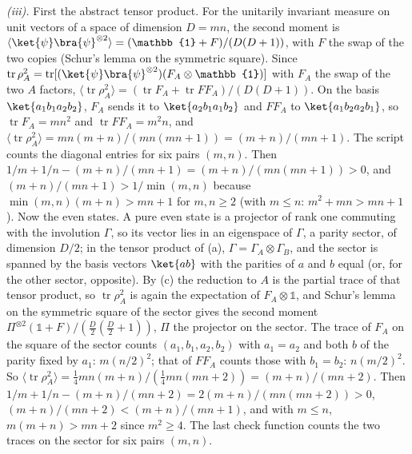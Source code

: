 \emph{(iii).} First the abstract tensor product. For the unitarily invariant measure on unit vectors of a space of dimension $D = mn$, the second moment is $\langle\ket{\psi}\bra{\psi}^{\otimes 2}\rangle = (\mathbb{1} + F)/(D(D + 1))$, with $F$ the swap of the two copies (Schur's lemma on the symmetric square). Since $\operatorname{tr}\rho_{A}^{2} = \operatorname{tr}[(\ket{\psi}\bra{\psi}^{\otimes 2})(F_{A} \otimes \mathbb{1})]$ with $F_{A}$ the swap of the two $A$ factors, $\langle\operatorname{tr}\rho_{A}^{2}\rangle = (\operatorname{tr}F_{A} + \operatorname{tr}FF_{A})/(D(D + 1))$. On the basis $\ket{a_{1}b_{1}a_{2}b_{2}}$, $F_{A}$ sends it to $\ket{a_{2}b_{1}a_{1}b_{2}}$ and $FF_{A}$ to $\ket{a_{1}b_{2}a_{2}b_{1}}$, so $\operatorname{tr}F_{A} = mn^{2}$ and $\operatorname{tr}FF_{A} = m^{2}n$, and $\langle\operatorname{tr}\rho_{A}^{2}\rangle = mn(m + n)/(mn(mn + 1)) = (m + n)/(mn + 1)$. The script counts the diagonal entries for six pairs $(m, n)$. Then $1/m + 1/n - (m + n)/(mn + 1) = (m + n)/(mn(mn + 1)) > 0$, and $(m + n)/(mn + 1) > 1/\min(m, n)$ because $\min(m, n)(m + n) > mn + 1$ for $m, n \geq 2$ (with $m \leq n$: $m^{2} + mn > mn + 1$). Now the even states. A pure even state is a projector of rank one commuting with the involution $\Gamma$, so its vector lies in an eigenspace of $\Gamma$, a parity sector, of dimension $D/2$; in the tensor product of (a), $\Gamma = \Gamma_{A} \otimes \Gamma_{B}$, and the sector is spanned by the basis vectors $\ket{ab}$ with the parities of $a$ and $b$ equal (or, for the other sector, opposite). By (c) the reduction to $A$ is the partial trace of that tensor product, so $\operatorname{tr}\rho_{A}^{2}$ is again the expectation of $F_{A} \otimes \mathbb{1}$, and Schur's lemma on the symmetric square of the sector gives the second moment $\Pi^{\otimes 2}(\mathbb{1} + F)/(\tfrac{D}{2}(\tfrac{D}{2} + 1))$, $\Pi$ the projector on the sector. The trace of $F_{A}$ on the square of the sector counts $(a_{1}, b_{1}, a_{2}, b_{2})$ with $a_{1} = a_{2}$ and both $b$ of the parity fixed by $a_{1}$: $m(n/2)^{2}$; that of $FF_{A}$ counts those with $b_{1} = b_{2}$: $n(m/2)^{2}$. So $\langle\operatorname{tr}\rho_{A}^{2}\rangle = \tfrac14 mn(m + n)/(\tfrac14 mn(mn + 2)) = (m + n)/(mn + 2)$. Then $1/m + 1/n - (m + n)/(mn + 2) = 2(m + n)/(mn(mn + 2)) > 0$, $(m + n)/(mn + 2) < (m + n)/(mn + 1)$, and with $m \le n$, $m(m + n) > mn + 2$ since $m^{2} \ge 4$. The last check function counts the two traces on the sector for six pairs $(m, n)$.

